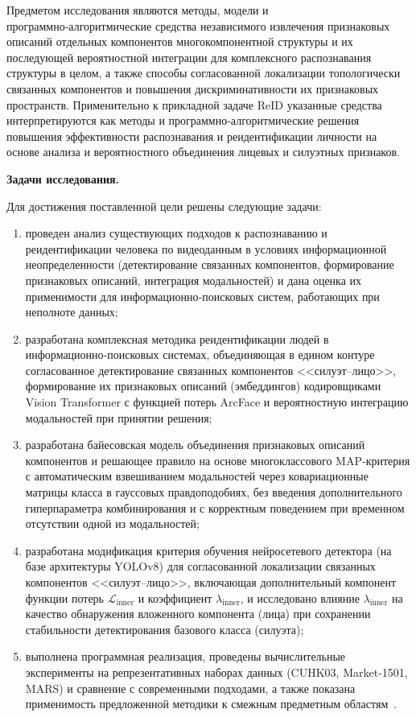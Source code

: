Предметом исследования являются методы, модели и программно‑алгоритмические
средства независимого извлечения признаковых описаний отдельных
компонентов многокомпонентной структуры и их последующей вероятностной
интеграции для комплексного распознавания структуры в целом, а также
способы согласованной локализации топологически связанных компонентов и
повышения дискриминативности их признаковых пространств. Применительно к
прикладной задаче ReID указанные средства интерпретируются как методы и
программно‑алгоритмические решения повышения эффективности
распознавания и реидентификации личности на основе анализа и
вероятностного объединения лицевых и силуэтных признаков.

\textbf{Задачи исследования.}

Для достижения поставленной цели решены следующие задачи:
\begin{enumerate}
    \item проведен анализ существующих подходов к распознаванию и
    реидентификации человека по видеоданным в условиях информационной
    неопределенности (детектирование связанных компонентов, формирование
    признаковых описаний, интеграция модальностей) и дана оценка их
    применимости для информационно‑поисковых систем, работающих при
    неполноте данных;

    \item разработана комплексная методика реидентификации людей в
    информационно‑поисковых системах, объединяющая в едином контуре
    согласованное детектирование связанных компонентов <<силуэт--лицо>>,
    формирование их признаковых описаний (эмбеддингов) кодировщиками
    Vision Transformer с функцией потерь ArcFace и вероятностную
    интеграцию модальностей при принятии решения;

    \item разработана байесовская модель объединения признаковых описаний
    компонентов и решающее правило на основе многоклассового
    MAP‑критерия с автоматическим взвешиванием модальностей через
    ковариационные матрицы класса в гауссовых правдоподобиях, без введения
    дополнительного гиперпараметра комбинирования и с корректным поведением
    при временном отсутствии одной из модальностей;

    \item разработана модификация критерия обучения нейросетевого
    детектора (на базе архитектуры YOLOv8) для согласованной локализации
    связанных компонентов <<силуэт--лицо>>, включающая дополнительный
    компонент функции потерь $\mathcal{L}_{\text{inner}}$ и коэффициент
    $\lambda_{\text{inner}}$, и исследовано влияние $\lambda_{\text{inner}}$
    на качество обнаружения вложенного компонента (лица) при сохранении
    стабильности детектирования базового класса (силуэта);

    \item выполнена программная реализация, проведены вычислительные
    эксперименты на репрезентативных наборах данных (CUHK03,
    Market‑1501, MARS) и сравнение с современными подходами, а также
    показана применимость предложенной методики к смежным предметным
    областям~\cite{Rusakov2021corrosion,Rusakov2020license,Rusakov2023uavspeed,Rusakov2024marine}.
\end{enumerate}

